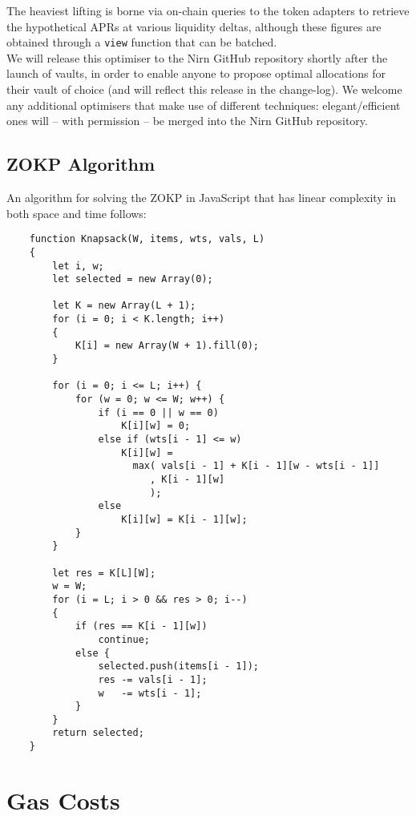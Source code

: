 \documentclass{article}
\begin{document}
\noindent
The heaviest lifting is borne via on-chain queries to the token adapters to retrieve the hypothetical APRs at various liquidity deltas, although these figures are obtained through a \texttt{view} function that can be batched.\\

\noindent
We will release this optimiser to the Nirn GitHub repository shortly after the launch of vaults, in order to enable anyone to propose optimal allocations for their vault of choice (and will reflect this release in the change-log). We welcome any additional optimisers that make use of different techniques: elegant/efficient ones will -- with permission -- be merged into the Nirn GitHub repository.

\newpage
\subsection{ZOKP Algorithm}
\label{zokp}

An algorithm for solving the ZOKP in JavaScript that has linear complexity in both space and time follows:

\begin{verbatim}
    function Knapsack(W, items, wts, vals, L)
    {
        let i, w;
        let selected = new Array(0);
        
        let K = new Array(L + 1);
        for (i = 0; i < K.length; i++)
        {
            K[i] = new Array(W + 1).fill(0);
        }
        
        for (i = 0; i <= L; i++) {
            for (w = 0; w <= W; w++) {
                if (i == 0 || w == 0)
                    K[i][w] = 0;
                else if (wts[i - 1] <= w)
                    K[i][w] =
                      max( vals[i - 1] + K[i - 1][w - wts[i - 1]]
                         , K[i - 1][w]
                         );
                else
                    K[i][w] = K[i - 1][w];
            }
        }
        
        let res = K[L][W];
        w = W;
        for (i = L; i > 0 && res > 0; i--)
        {
            if (res == K[i - 1][w])
                continue;
            else {
                selected.push(items[i - 1]);
                res -= vals[i - 1];
                w   -= wts[i - 1];
            }
        }
        return selected;
    }
\end{verbatim}

\newpage
\section{Gas Costs}
\end{document}
